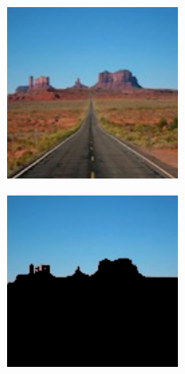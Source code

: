 \begin{figure}
    \centering
    \begin{subfigure}{0.31\textwidth}
        \includegraphics[width=\textwidth]{figures/RegMon.pdf}
    \end{subfigure}
   \hspace*{\fill}
    \begin{subfigure}{0.31\textwidth}
        \includegraphics[width=\textwidth]{figures/NegMon.pdf}

\end{subfigure}
\end{figure}
